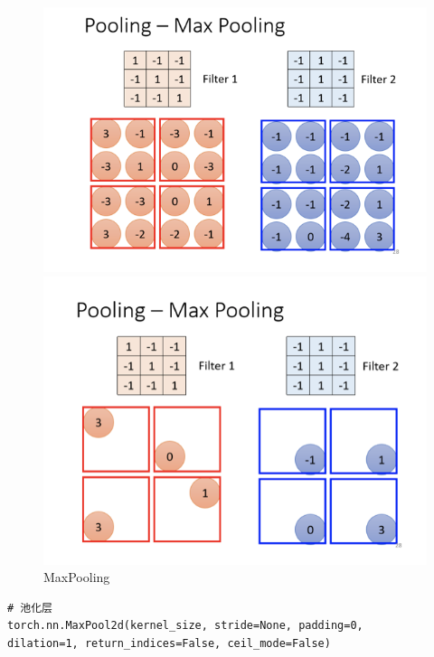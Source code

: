\documentclass{article}
\begin{document}
\begin{figure}[H]
	\begin{minipage}[t]{0.5\linewidth}
		\centering
		\includegraphics[scale=0.5]{picture/MapPolling1.png}
	\end{minipage}
    \quad
	\begin{minipage}[t]{0.5\linewidth}
		\centering
		\includegraphics[scale=0.5]{picture/MaxPolling2.png}
	\end{minipage}
	\caption{MaxPooling}
	\label{fig:galxy}
\end{figure}
\begin{lstlisting}
# 池化层
torch.nn.MaxPool2d(kernel_size, stride=None, padding=0, 
dilation=1, return_indices=False, ceil_mode=False)
\end{lstlisting}
\end{document}
